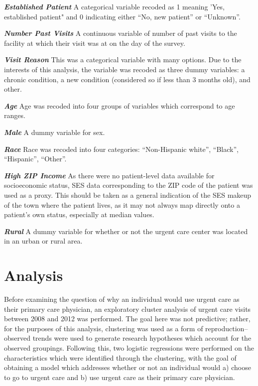 \documentclass[12pt,twoside]{reedthesis}
\begin{document}
  \textbf{\emph{Established Patient}} A categorical variable recoded as 1
  meaning 'Yes, established patient" and 0 indicating either ``No, new
  patient'' or ``Unknown''.
  
  \textbf{\emph{Number Past Visits}} A continuous variable of number of
  past visits to the facility at which their visit was at on the day of
  the survey.
  
  \textbf{\emph{Visit Reason}} This was a categorical variable with many
  options. Due to the interests of this analysis, the variable was recoded
  as three dummy variables: a chronic condition, a new condition
  (considered so if less than 3 months old), and other.
  
  \textbf{\emph{Age}} Age was recoded into four groups of variables which
  correspond to age ranges.
  
  \textbf{\emph{Male}} A dummy variable for sex.
  
  \textbf{\emph{Race}} Race was recoded into four categories:
  ``Non-Hispanic white'', ``Black'', ``Hispanic'', ``Other''.
  
  \textbf{\emph{High ZIP Income}} As there were no patient-level data
  available for socioeconomic status, SES data corresponding to the ZIP
  code of the patient was used as a proxy. This should be taken as a
  general indication of the SES makeup of the town where the patient
  lives, as it may not always map directly onto a patient's own status,
  especially at median values.
  
  \textbf{\emph{Rural}} A dummy variable for whether or not the urgent
  care center was located in an urban or rural area.
  
  \chapter*{Analysis}\label{analysis}
  
  Before examining the question of why an individual would use urgent care
  as their primary care physician, an exploratory cluster analysis of
  urgent care visits between 2008 and 2012 was performed. The goal here
  was not predictive; rather, for the purposes of this analysis,
  clustering was used as a form of reproduction--observed trends were used
  to generate research hypotheses which account for the observed
  groupings. Following this, two logistic regressions were performed on
  the characteristics which were identified through the clustering, with
  the goal of obtaining a model which addresses whether or not an
  individual would a) choose to go to urgent care and b) use urgent care
  as their primary care physician.
  
\end{document}
